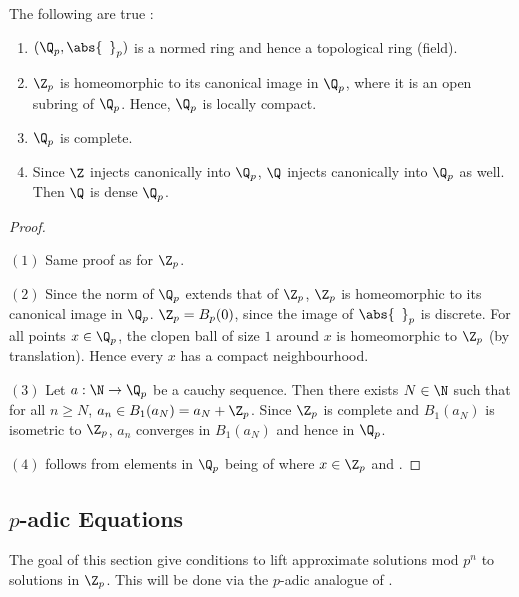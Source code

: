 \begin{prop}
  
  The following are true : 
  \begin{enumerate}
    \item $(\Q_p,\abs{\hspace{5pt}}_p)$ is a normed ring 
    and hence a topological ring (field). 
    \item $\Z_p$ is homeomorphic to its canonical image in $\Q_p$,
    where it is an open subring of $\Q_p$.
    Hence, $\Q_p$ is locally compact. 
    \item $\Q_p$ is complete. 
    \item Since $\Z$ injects canonically into $\Q_p$, 
    $\Q$ injects canonically into $\Q_p$ as well. 
    Then $\Q$ is dense $\Q_p$.
  \end{enumerate}
\end{prop}
\begin{proof}~
  
  $(1)$ Same proof as for $\Z_p$.
  
  $(2)$ Since the norm of $\Q_p$ extends that of $\Z_p$, 
  $\Z_p$ is homeomorphic to its canonical image in $\Q_p$. 
  $\Z_p = B_{p}(0)$, since the image of $\abs{\hspace{5pt}}_p$ is discrete. 
  For all points $x \in \Q_p$, 
  the clopen ball of size $1$ around $x$ is homeomorphic to $\Z_p$ 
  (by translation).
  Hence every $x$ has a compact neighbourhood. 

  $(3)$ Let $a : \N \to \Q_p$ be a cauchy sequence. 
  Then there exists $N \in \N$ such that for all $n \geq N$, 
  $a_n \in B_1(a_N) = a_N + \Z_p$. 
  Since $\Z_p$ is complete and $B_1(a_N)$ is isometric to $\Z_p$,
  $a_n$ converges in $B_1(a_N)$
  and hence in $\Q_p$. 

  $(4)$ follows from elements in $\Q_p$ being 
  of 
  where $x \in \Z_p$ and 
  . 
\end{proof}

\subsection{\texorpdfstring{$p$-adic Equations}{TEXT}}

The goal of this section give 
conditions to lift approximate solutions mod $p^n$ to solutions in $\Z_p$. 
This will be done via the $p$-adic analogue of 
.


